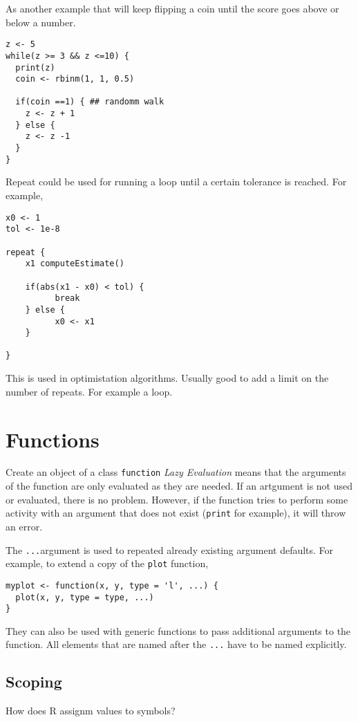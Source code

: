 \documentclass[12pt, a4paper, oneside]{article}\usepackage[]{graphicx}\usepackage[]{color}
\begin{document}
As another example that will keep flipping a coin until the score goes above or below a number. 

\begin{lstlisting}
z <- 5
while(z >= 3 && z <=10) {
  print(z)
  coin <- rbinm(1, 1, 0.5)
  
  if(coin ==1) { ## randomm walk
    z <- z + 1
  } else {
    z <- z -1
  }
}
\end{lstlisting}

Repeat could be used for running a loop until a certain tolerance is reached.  For example, 
\begin{lstlisting}
x0 <- 1
tol <- 1e-8

repeat {
    x1 computeEstimate()
    
    if(abs(x1 - x0) < tol) {
          break
    } else {
          x0 <- x1
    }
      
}
\end{lstlisting}

This is used in optimistation algorithms. Usually good to add a limit on the number of repeats. For example a loop. 

\section{Functions}
Create an object of a class \lstinline{function}
\emph{Lazy Evaluation} means that the arguments of the function are only evaluated as they are needed. If an artgument is not used or evaluated, there is no problem. However, if the function tries to perform some activity with an argument that does not exist (\lstinline{print} for example), it will throw an error. 

The  \lstinline{...}argument is used to repeated already existing argument defaults.  For example, to extend a copy of the \lstinline{plot} function, 

\begin{lstlisting}
myplot <- function(x, y, type = 'l', ...) {
  plot(x, y, type = type, ...)
}
\end{lstlisting}

They can also be used with generic functions to pass additional arguments to the function.  All elements that are named after the \lstinline{...} have to be named explicitly. 

\subsection{Scoping}
How does R assignm values to symbols? 
\end{document}
